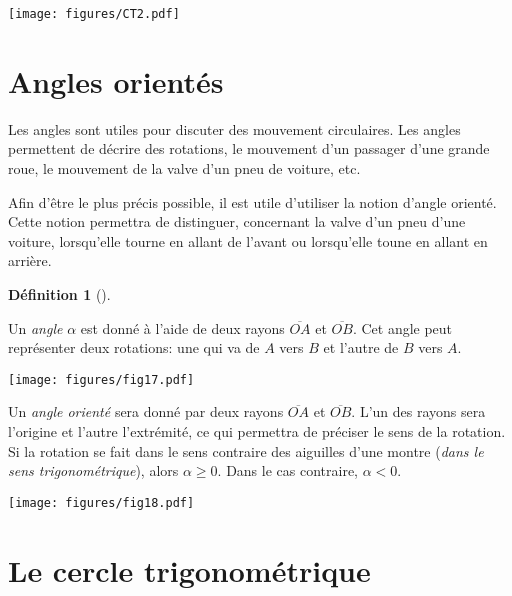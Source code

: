\documentclass[
  a4paper,
  DIV=11,
  numbers=noendperiod,
  oneside]{scrreprt}
\theoremstyle{definition}
\newtheorem{definition}{Définition}[chapter]
\theoremstyle{definition}
\theoremstyle{plain}
\theoremstyle{definition}
\theoremstyle{remark}
\begin{document}
\begin{center}
\texttt{[image: figures/CT2.pdf]}
\end{center}

\section{Angles orientés}\label{angles-orientuxe9s}

Les angles sont utiles pour discuter des mouvement circulaires. Les
angles permettent de décrire des rotations, le mouvement d'un passager
d'une grande roue, le mouvement de la valve d'un pneu de voiture, etc.

Afin d'être le plus précis possible, il est utile d'utiliser la notion
d'angle orienté. Cette notion permettra de distinguer, concernant la
valve d'un pneu d'une voiture, lorsqu'elle tourne en allant de l'avant
ou lorsqu'elle toune en allant en arrière.

\begin{definition}[]\protect\hypertarget{def-angles}{}\label{def-angles}

Un \emph{angle} \(\alpha\) est donné à l'aide de deux rayons
\(\overline{OA}\) et \(\overline{OB}\). Cet angle peut représenter deux
rotations: une qui va de \(A\) vers \(B\) et l'autre de \(B\) vers
\(A\).

\begin{center}
\texttt{[image: figures/fig17.pdf]}
\end{center}

Un \emph{angle orienté} sera donné par deux rayons \(\overline{OA}\) et
\(\overline{OB}\). L'un des rayons sera l'origine et l'autre
l'extrémité, ce qui permettra de préciser le sens de la rotation. Si la
rotation se fait dans le sens contraire des aiguilles d'une montre
(\emph{dans le sens trigonométrique}), alors \(\alpha\ge0\). Dans le cas
contraire, \(\alpha<0\).

\begin{center}
\texttt{[image: figures/fig18.pdf]}
\end{center}

\end{definition}

\section{Le cercle trigonométrique}\label{le-cercle-trigonomuxe9trique}
\end{document}
